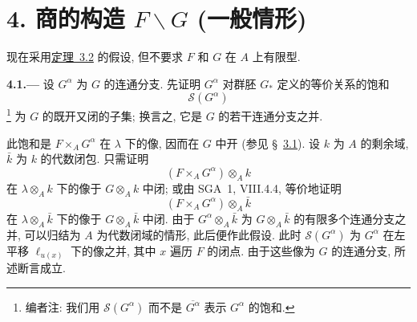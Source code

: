
\section*{4. 商的构造 \(F\backslash G\)
  (一般情形)}
\label{sec:sga3-VIA-4}

现在采用\hyperref[thm:sga3-VIA-3.2]{定理~3.2} 的假设,
但不要求 \(F\) 和 \(G\) 在 \(A\) 上有限型.

\medskip
{}\label{par:sga3-VIA-4.1}%
\noindent\textbf{4.1.---}
设 \(G^\alpha\) 为 \(G\) 的连通分支. 先证明 \(G^\alpha\)
对群胚 \(G_*\) 定义的等价关系的饱和
\[
  \mathscr S(G^\alpha)
\]%
\footnote{\label{note:sga3-VIA-44}编者注: 我们用 \(\mathscr S(G^\alpha)\) 而不是
\(\overline{G^\alpha}\) 表示 \(G^\alpha\) 的饱和.}
为 \(G\) 的既开又闭的子集; 换言之, 它是 \(G\) 的若干连通分支之并.

此饱和是 \(F\times_A G^\alpha\) 在 \(\lambda\) 下的像,
因而在 \(G\) 中开 (参见 \S~\hyperref[par:sga3-VIA-3.1]{3.1}).
设 \(k\) 为 \(A\) 的剩余域, \(\bar k\) 为 \(k\) 的代数闭包.
只需证明
\[
  (F\times_A G^\alpha)\otimes_A k
\]
在 \(\lambda\otimes_A k\) 下的像于 \(G\otimes_A k\) 中闭;
或由 SGA~1, VIII.4.4, 等价地证明
\[
  (F\times_A G^\alpha)\otimes_A\bar k
\]
在 \(\lambda\otimes_A\bar k\) 下的像于 \(G\otimes_A\bar k\) 中闭.
由于 \(G^\alpha\otimes_A\bar k\) 为 \(G\otimes_A\bar k\) 的有限多个连通分支之并,
可以归结为 \(A\) 为代数闭域的情形, 此后便作此假设.
此时 \(\mathscr S(G^\alpha)\) 为 \(G^\alpha\) 在左平移
\(\ell_{u(x)}\) 下的像之并, 其中 \(x\) 遍历 \(F\) 的闭点.
由于这些像为 \(G\) 的连通分支, 所述断言成立.
